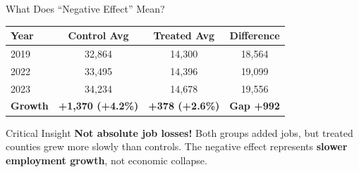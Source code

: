 \documentclass[aspectratio=169]{beamer}
\begin{document}
\begin{frame}{What Does ``Negative Effect'' Mean?}
\begin{table}
\footnotesize
\begin{tabular}{lccc}
\toprule
\textbf{Year} & \textbf{Control Avg} & \textbf{Treated Avg} & \textbf{Difference} \\
\midrule
2019 & 32,864 & 14,300 & 18,564 \\
2022 & 33,495 & 14,396 & 19,099 \\
2023 & 34,234 & 14,678 & 19,556 \\
\addlinespace
\textbf{Growth} & \textbf{+1,370 (+4.2\%)} & \textbf{+378 (+2.6\%)} & \textbf{Gap +992} \\
\bottomrule
\end{tabular}
\end{table}



\vspace{0.3cm}

\begin{alertblock}{Critical Insight}
\textbf{Not absolute job losses!} Both groups added jobs, but treated counties grew more slowly than controls. The negative effect represents \textbf{slower employment growth}, not economic collapse.
\end{alertblock}
\end{frame}
\end{document}
